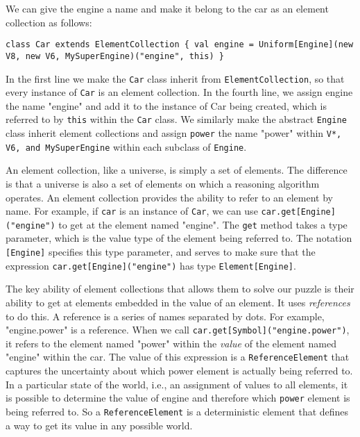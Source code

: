 We can give the engine a name and make it belong to the car as an element collection as follows:

\begin{flushleft}
\texttt{class Car extends ElementCollection \{
\newline \tab val engine = Uniform[Engine](new V8, new V6, MySuperEngine)("engine", this)
\newline \}
}
\end{flushleft}

In the first line we make the \texttt{Car} class inherit from \texttt{ElementCollect\-ion}, so that every instance of \texttt{Car} is an element collection. In the fourth line, we assign engine the name "engine" and add it to the instance of Car being created, which is referred to by \texttt{this} within the \texttt{Car} class. We similarly make the abstract \texttt{Engine} class inherit  element collections and assign \texttt{power} the name "power" within \texttt{V*, V6, and MySuperEngine} within each subclass of  \texttt{Engine}.

An element collection, like a universe, is simply a set of elements. The difference is that a universe is also a set of elements on which a reasoning algorithm operates. An element collection provides the ability to refer to an element by name. For example, if \texttt{car} is an instance of \texttt{Car}, we can use \texttt{car.get[Engine]("engine")} to get at the element named "engine". The \texttt{get} method takes a type parameter, which is the value type of the element being referred to. The notation \texttt{[Engine]} specifies this type parameter, and serves to make sure that the expression \texttt{car.get[Engine]("engine")} has type \texttt{Element[Engine]}.

The key ability of element collections that allows them to solve our puzzle is their ability to get at elements embedded in the value of an element.  It uses \emph{references} to do this. A reference is a series of names separated by dots. For example, "engine.power" is a reference. When we call \texttt{car.get[Symbol]("engine.power")}, it refers to the element named "power" within the \emph{value} of the element named "engine" within the car. The value of this expression is a \texttt{ReferenceElement} that captures the uncertainty about which power element is actually being referred to. In a particular state of the world, i.e., an assignment of values to all elements, it is possible to determine the value of engine and therefore which \texttt{power} element is being referred to. So a \texttt{ReferenceElement} is a deterministic element that defines a way to get its value in any possible world.

